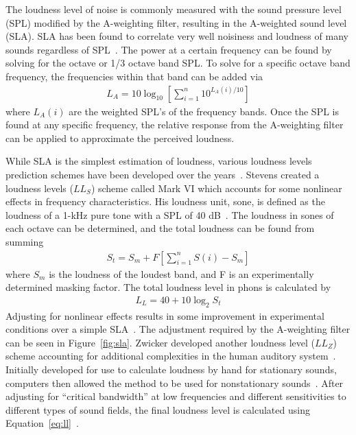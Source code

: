 \documentclass[]{aiaa-tc}%
\begin{document}
The loudness level of noise is commonly measured with the sound pressure level (SPL) modified by the A-weighting filter, resulting in the A-weighted sound level (SLA). SLA has been found to correlate very well noisiness and loudness of many sounds regardless of SPL~\cite{powell1991human}. The power at a certain frequency can be found by solving for the octave or 1/3 octave band SPL. To solve for a specific octave band frequency, the frequencies within that band can be added via
\begin{align}
L_A = 10 \log_{10} \left[ \sum_{i=1}^n 10^{L_A(i)/10} \right]
\end{align}
where $L_A(i)$ are the weighted SPL's of the frequency bands. Once the SPL is found at any specific frequency, the relative response from the A-weighting filter can be applied to approximate the perceived loudness.

While SLA is the simplest estimation of loudness, various loudness levels prediction schemes have been developed over the years~\cite{stevens1961procedure, zwicker1966comparison}. Stevens created a loudness levels ($LL_S$) scheme called Mark VI which accounts for some nonlinear effects in frequency characteristics. His loudness unit, sone, is defined as the loudness of a 1-kHz pure tone with a SPL of 40 dB~\cite{powell1991human}. The loudness in sones of each octave can be determined, and the total loudness can be found from summing
\begin{align}
S_t = S_m + F \left[ \sum_{i=1}^n S(i) - S_m \right]
\end{align}
where $S_m$ is the loudness of the loudest band, and F is an experimentally determined masking factor. The total loudness level in phons is calculated by
\begin{align}
L_L = 40 + 10 \log_2 S_t
\label{eq:ll}
\end{align}
Adjusting for nonlinear effects results in some improvement in experimental conditions over a simple SLA~\cite{stevens1961procedure}. The adjustment required by the A-weighting filter can be seen in Figure~\ref{fig:sla}. Zwicker developed another loudness level ($LL_Z$) scheme accounting for additional complexities in the human auditory system~\cite{zwicker1966comparison}. Initially developed for use to calculate loudness by hand for stationary sounds, computers then allowed the method to be used for nonstationary sounds~\cite{powell1991human}. After adjusting for ``critical bandwidth'' at low frequencies and different sensitivities to different types of sound fields, the final loudness level is calculated using Equation~\ref{eq:ll}~\cite{zwicker1966comparison}.
\end{document}
